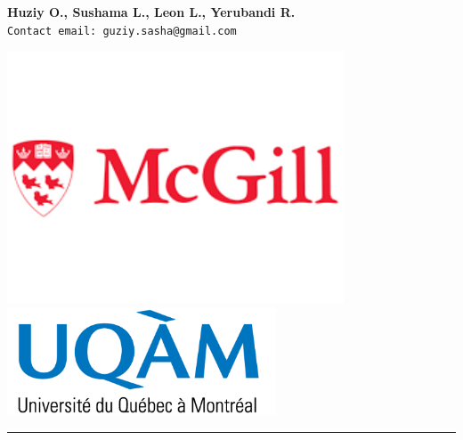 \documentclass[a0b,landscape]{a0poster}
\begin{document}
\begin{minipage}[b]{\linewidth}
\begin{minipage}[c]{0.45\linewidth}
  \center
  \large \textbf{Huziy O., Sushama L., Leon L., Yerubandi R.} \\[0.5cm]
  \large \texttt{Contact email: guziy.sasha@gmail.com}
\end{minipage}
%
\hfill
%
\begin{minipage}[c]{0.25\linewidth}
  \center
  \includegraphics[width=10cm,align=c]{mcgill_logo.png} \includegraphics[width=8cm,align=c]{logo_uqam.png}  %
\end{minipage}

%
\rule{\linewidth}{3pt}
\end{minipage}
%


\end{document}
